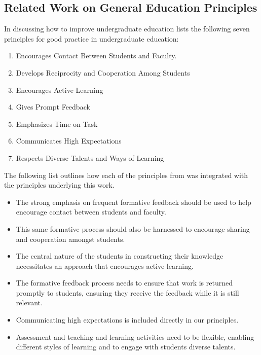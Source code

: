 

\subsection{Related Work on General Education Principles} %
\label{ssub:related_work_on_education_principles}

In discussing how to improve undergraduate education \citet{Chickering:1987} lists the following seven principles for good practice in undergraduate education:
\begin{enumerate}
	\item Encourages Contact Between Students and Faculty.
	\item Develops Reciprocity and Cooperation Among Students
	\item Encourages Active Learning
	\item Gives Prompt Feedback
	\item Emphasizes Time on Task
	\item Communicates High Expectations
	\item Respects Diverse Talents and Ways of Learning
\end{enumerate}


The following list outlines how each of the principles from \citet{Chickering:1987} was integrated with the principles underlying this work. 

\begin{itemize}
	\item The strong emphasis on frequent formative feedback should be used to help encourage contact between students and faculty.
	\item This same formative process should also be harnessed to encourage sharing and cooperation amongst students.
	\item The central nature of the students in constructing their knowledge necessitates an approach that encourages active learning.
	\item The formative feedback process needs to ensure that work is returned promptly to students, ensuring they receive the feedback while it is still relevant.
	\item Communicating high expectations is included directly in our principles.
	\item Assessment and teaching and learning activities need to be flexible, enabling different styles of learning and to engage with students diverse talents.
\end{itemize}

